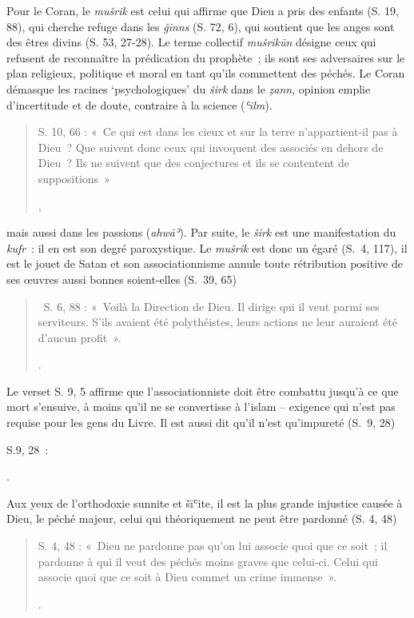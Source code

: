 Pour le Coran, le \emph{mušrik} est celui
qui affirme que Dieu a pris des enfants (S. 19, 88), qui cherche refuge
dans les \emph{ǧinns} (S. 72, 6), qui soutient que les anges sont des
êtres divins (S. 53, 27-28). Le terme collectif \emph{mušrikūn} désigne
ceux qui refusent de reconnaître la prédication du prophète~; ils sont
ses adversaires sur le plan religieux, politique et moral en tant qu'ils
commettent des péchés. Le Coran démasque les racines `psychologiques' du
\emph{širk} dans le \emph{ẓann}, opinion emplie d'incertitude et de
doute, contraire à la science (\emph{ʿilm}).
\begin{quote}
    {S. 10, 66 : «~Ce
  qui est dans les cieux et sur la terre n'appartient-il pas à Dieu~?
  Que suivent donc ceux qui invoquent des associés en dehors de Dieu~?
  Ils ne suivent que des conjectures et ils se contentent de
  suppositions~»

  },

\end{quote}
mais aussi dans les passions (\emph{ahwāʾ}). Par suite, le \emph{širk}
est une manifestation du \emph{kufr}~: il en est son degré paroxystique.
Le \emph{mušrik} est donc un égaré (S.~4, 117), il est le jouet de Satan
et son associationnisme annule toute rétribution positive de ses œuvres
aussi bonnes soient-elles (S.~39, 65)
\begin{quote}
    {~S. 6, 88 : «~Voilà la
  Direction de Dieu. Il dirige qui il veut parmi ses serviteurs. S'ils
  avaient été polythéistes, leurs actions ne leur auraient été d'aucun
  profit~».

  }.
\end{quote}

Le
verset S. 9, 5 affirme que l'associationniste doit être combattu jusqu'à
ce que mort s'ensuive, à moins qu'il ne se convertisse à l'islam --
exigence qui n'est pas requise pour les gens du Livre. Il est aussi dit
qu'il n'est qu'impureté (S.~9, 28)
{S.9, 28~:

  }.

Aux yeux de l'orthodoxie sunnite et šīʿite, il est la plus grande
injustice causée à Dieu, le péché majeur, celui qui théoriquement ne
peut être pardonné (S. 4, 48)
\begin{quote}
    {S. 4, 48 : «~Dieu ne pardonne pas
  qu'on lui associe quoi que ce soit~; il pardonne à qui il veut des
  péchés moins graves que celui-ci. Celui qui associe quoi que ce soit à
  Dieu commet un crime immense~».

  }.

\end{quote}

